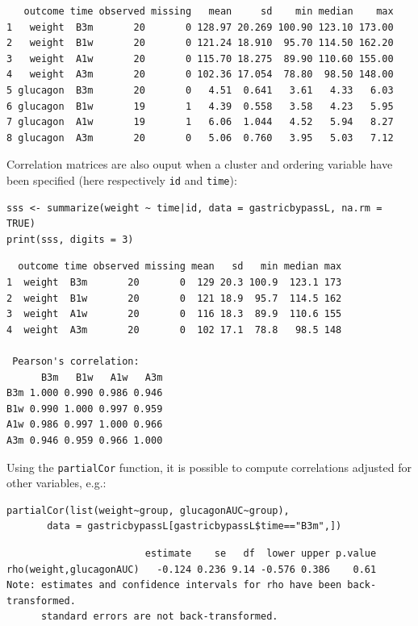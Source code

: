 \documentclass[12pt]{article}
\begin{document}
\begin{verbatim}
   outcome time observed missing   mean     sd    min median    max
1   weight  B3m       20       0 128.97 20.269 100.90 123.10 173.00
2   weight  B1w       20       0 121.24 18.910  95.70 114.50 162.20
3   weight  A1w       20       0 115.70 18.275  89.90 110.60 155.00
4   weight  A3m       20       0 102.36 17.054  78.80  98.50 148.00
5 glucagon  B3m       20       0   4.51  0.641   3.61   4.33   6.03
6 glucagon  B1w       19       1   4.39  0.558   3.58   4.23   5.95
7 glucagon  A1w       19       1   6.06  1.044   4.52   5.94   8.27
8 glucagon  A3m       20       0   5.06  0.760   3.95   5.03   7.12
\end{verbatim}


Correlation matrices are also ouput when a cluster and ordering
variable have been specified (here respectively \texttt{id} and \texttt{time}):
\lstset{language=r,label= ,caption= ,captionpos=b,numbers=none}
\begin{lstlisting}
sss <- summarize(weight ~ time|id, data = gastricbypassL, na.rm = TRUE)
print(sss, digits = 3)
\end{lstlisting}

\begin{verbatim}
  outcome time observed missing mean   sd   min median max
1  weight  B3m       20       0  129 20.3 100.9  123.1 173
2  weight  B1w       20       0  121 18.9  95.7  114.5 162
3  weight  A1w       20       0  116 18.3  89.9  110.6 155
4  weight  A3m       20       0  102 17.1  78.8   98.5 148

 Pearson's correlation: 
      B3m   B1w   A1w   A3m
B3m 1.000 0.990 0.986 0.946
B1w 0.990 1.000 0.997 0.959
A1w 0.986 0.997 1.000 0.966
A3m 0.946 0.959 0.966 1.000
\end{verbatim}

Using the \texttt{partialCor} function, it is possible to compute
correlations adjusted for other variables, e.g.:
\lstset{language=r,label= ,caption= ,captionpos=b,numbers=none}
\begin{lstlisting}
partialCor(list(weight~group, glucagonAUC~group),
	   data = gastricbypassL[gastricbypassL$time=="B3m",])
\end{lstlisting}

\begin{verbatim}
                        estimate    se   df  lower upper p.value
rho(weight,glucagonAUC)   -0.124 0.236 9.14 -0.576 0.386    0.61
Note: estimates and confidence intervals for rho have been back-transformed. 
      standard errors are not back-transformed.
\end{verbatim}
\end{document}
